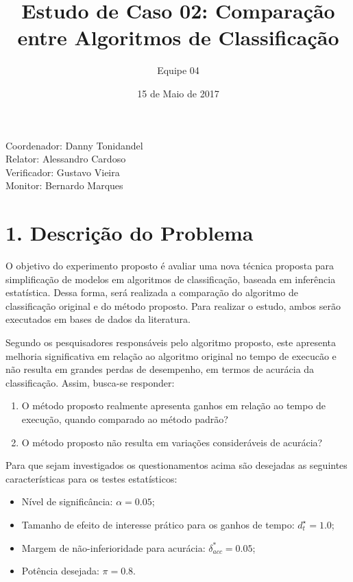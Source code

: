 \documentclass[]{article}
\title{Estudo de Caso 02: Comparação entre Algoritmos de Classificação}
\author{Equipe 04}
\date{15 de Maio de 2017}
\providecommand{\tightlist}{%
  \setlength{\itemsep}{0pt}\setlength{\parskip}{0pt}}
\begin{document}
\maketitle

Coordenador: Danny Tonidandel\\
Relator: Alessandro Cardoso\\
Verificador: Gustavo Vieira\\
Monitor: Bernardo Marques

\section{1. Descrição do Problema}\label{descricao-do-problema}

O objetivo do experimento proposto é avaliar uma nova técnica proposta
para simplificação de modelos em algoritmos de classificação, baseada em
inferência estatística. Dessa forma, será realizada a comparação do
algoritmo de classificação original e do método proposto. Para realizar
o estudo, ambos serão executados em bases de dados da literatura.

Segundo os pesquisadores responsáveis pelo algoritmo proposto, este
apresenta melhoria significativa em relação ao algoritmo original no
tempo de execucão e não resulta em grandes perdas de desempenho, em
termos de acurácia da classificação. Assim, busca-se responder:

\begin{enumerate}
\def\labelenumi{\arabic{enumi}.}
\tightlist
\item
  O método proposto realmente apresenta ganhos em relação ao tempo de
  execução, quando comparado ao método padrão?
\item
  O método proposto não resulta em variações consideráveis de acurácia?
\end{enumerate}

Para que sejam investigados os questionamentos acima são desejadas as
seguintes características para os testes estatísticos:

\begin{itemize}
\tightlist
\item
  Nível de significância: \(\alpha = 0.05\);
\item
  Tamanho de efeito de interesse prático para os ganhos de tempo:
  \({d^{\star}_{t}} = 1.0\);
\item
  Margem de não-inferioridade para acurácia:
  \(\delta_{acc}^{*} = 0.05\);
\item
  Potência desejada: \(\pi = 0.8\).
\end{itemize}
\end{document}
